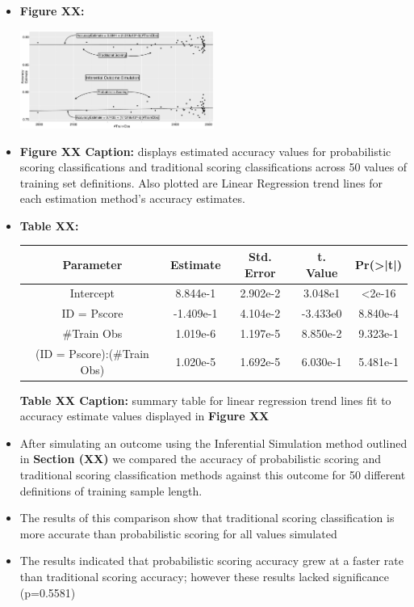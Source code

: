 \documentclass[12pt,]{article}
\begin{document}
\begin{itemize}
\item
  \textbf{Figure XX:}

  \begin{center}
  \includegraphics[width=0.5\textwidth]{Sup1Graph.jpg}
  \end{center}
\item
  \textbf{Figure XX Caption:} displays estimated accuracy values for
  probabilistic scoring classifications and traditional scoring
  classifications across 50 values of training set definitions. Also
  plotted are Linear Regression trend lines for each estimation method's
  accuracy estimates.
\item
  \textbf{Table XX:}

  \begin{center}
  \begin{tabular}{|c|c|c|c|c|}
  \hline
  Parameter                      & Estimate  & Std. Error & t. Value  & Pr(>|t|) \\
  \hline
  \hline
  Intercept                      &  8.844e-1 &  2.902e-2  &  3.048e1  & <2e-16   \\                             
  \hline
  ID = Pscore                    & -1.409e-1 &  4.104e-2  & -3.433e0  & 8.840e-4 \\
  \hline
  \#Train Obs                    &  1.019e-6 &  1.197e-5  &  8.850e-2 & 9.323e-1 \\
  \hline
  (ID = Pscore):(\#Train Obs) &  1.020e-5 &  1.692e-5  &  6.030e-1 & 5.481e-1 \\
  \hline
  \end{tabular}
  \end{center}

  \textbf{Table XX Caption:} summary table for linear regression trend
  lines fit to accuracy estimate values displayed in \textbf{Figure XX}
\item
  After simulating an outcome using the Inferential Simulation method
  outlined in \textbf{Section (XX)} we compared the accuracy of
  probabilistic scoring and traditional scoring classification methods
  against this outcome for 50 different definitions of training sample
  length.
\item
  The results of this comparison show that traditional scoring
  classification is more accurate than probabilistic scoring for all
  values simulated
\item
  The results indicated that probabilistic scoring accuracy grew at a
  faster rate than traditional scoring accuracy; however these results
  lacked significance (p=0.5581)
\end{itemize}
\end{document}
